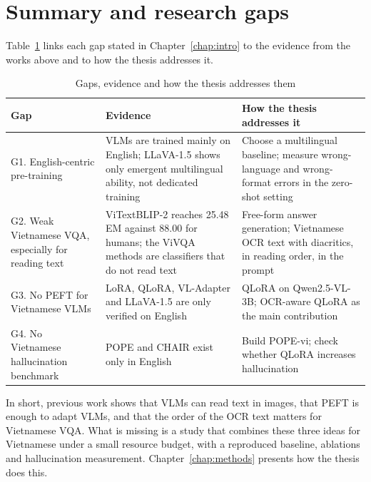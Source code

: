 \section{Summary and research gaps}
\label{sec:rel-summary}

Table~\ref{tab:rel-gaps} links each gap stated in Chapter~\ref{chap:intro} to the
evidence from the works above and to how the thesis addresses it.

\begin{table}[htbp]
\caption{Gaps, evidence and how the thesis addresses them}
\label{tab:rel-gaps}
\centering
\small
\begin{tabular}{p{}p{}p{}}
\toprule
\textbf{Gap} & \textbf{Evidence} & \textbf{How the thesis addresses it} \\
\midrule
G1. English-centric pre-training & VLMs are trained mainly on English; LLaVA-1.5 shows only emergent multilingual ability, not dedicated training & Choose a multilingual baseline; measure wrong-language and wrong-format errors in the zero-shot setting \\
G2. Weak Vietnamese VQA, especially for reading text & ViTextBLIP-2 reaches 25.48 EM against 88.00 for humans; the ViVQA methods are classifiers that do not read text & Free-form answer generation; Vietnamese OCR text with diacritics, in reading order, in the prompt \\
G3. No PEFT for Vietnamese VLMs & LoRA, QLoRA, VL-Adapter and LLaVA-1.5 are only verified on English & QLoRA on Qwen2.5-VL-3B; OCR-aware QLoRA as the main contribution \\
G4. No Vietnamese hallucination benchmark & POPE and CHAIR exist only in English & Build POPE-vi; check whether QLoRA increases hallucination \\
\bottomrule
\end{tabular}
\end{table}

In short, previous work shows that VLMs can read text in images, that PEFT is enough to
adapt VLMs, and that the order of the OCR text matters for Vietnamese VQA. What is
missing is a study that combines these three ideas for Vietnamese under a small resource
budget, with a reproduced baseline, ablations and hallucination measurement.
Chapter~\ref{chap:methods} presents how the thesis does this.
